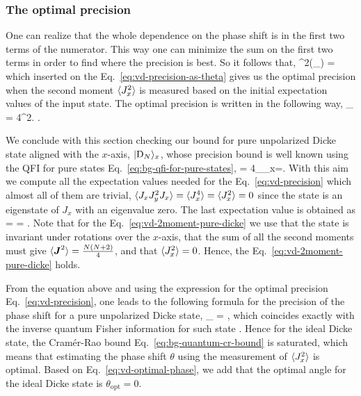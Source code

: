 \subsubsection{The optimal precision}
One can realize that the whole dependence on the phase shift is in the first two terms of the numerator.
This way one can minimize the sum on the first two terms in order to find where the precision is best.
So it follows that,
\be
  \label{eq:vd-optimal-phase}
  \tan^2(\theta_{}) = 
\ee
which inserted on the Eq.~\eqref{eq:vd-precision-as-theta} gives us the optimal precision when the second moment $\langle J_x^2 \rangle$ is measured based on the initial expectation values of the input state. The optimal precision is written in the following way,
\be
  \varian{\theta}_{} = 
  {4^2}.
  \label{eq:vd-precision}
\ee.

We conclude with this section checking our bound for pure unpolarized Dicke state aligned with the $x$-axis, $\vert \textnormal{D}_{N} \rangle_x$, whose precision bound is well known using the QFI for pure states Eq.~\eqref{eq:bg-qfi-for-pure-states},
\be
   = 4_{_x}=.
\ee
With this aim we compute all the expectation values needed for the Eq.~\eqref{eq:vd-precision} which almost all of them are trivial, $\langle J_xJ_y^2J_x \rangle=\langle J_x^4 \rangle=\langle J_x^2 \rangle=0$ since the state is an eigenstate of $J_x$ with an eigenvalue zero.
The last expectation value is obtained as
\be
   =  = .
  \label{eq:vd-2moment-pure-dicke}
\ee
Note that for the Eq.~\eqref{eq:vd-2moment-pure-dicke} we use that the state is invariant under rotations over the $x$-axis, that the sum of all the second moments must give $\langle \boldsymbol{J}^2 \rangle = \frac{N (N+2)}{4}$, and that $\langle J_x^2 \rangle=0$.
Hence, the Eq.~\eqref{eq:vd-2moment-pure-dicke} holds.

From the equation above and using the expression for the optimal precision Eq.~\eqref{eq:vd-precision}, one leads to the following formula for the precision of the phase shift for a pure unpolarized Dicke state,
\be
  \varian{\theta}_{} = ,
\ee
which coincides exactly with the inverse quantum Fisher information for such state \cite{VD48}.
Hence for the ideal Dicke state, the Cramér-Rao bound Eq.~\eqref{eq:bg-quantum-cr-bound} is saturated, which means that estimating the phase shift $\theta$ using the measurement of $\langle J_x^2 \rangle$ is optimal.
Based on Eq.~\eqref{eq:vd-optimal-phase}, we add that the optimal angle for the ideal Dicke state is $\theta_{\text{opt}}=0$.


